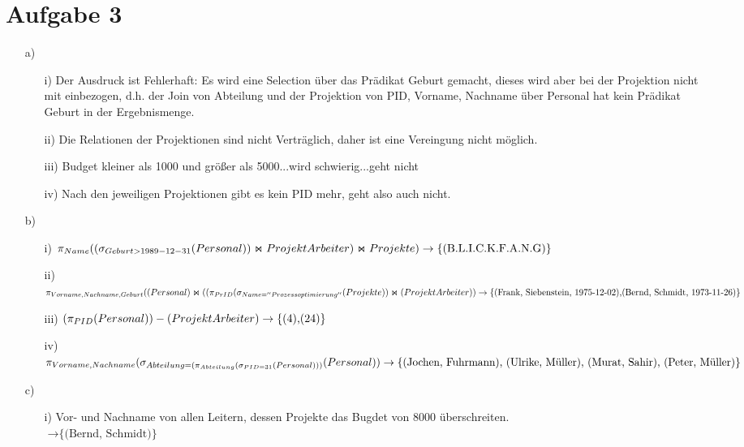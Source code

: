 \documentclass[a4paper,10pt,]{scrartcl}
\begin{document}
\section*{Aufgabe 3}
\begin{enumerate}
 \item[a)]
 \begin{enumerate}
  \item[i)] Der Ausdruck ist Fehlerhaft: Es wird eine Selection über das Prädikat Geburt gemacht, dieses wird aber bei der Projektion nicht mit einbezogen, d.h. der Join von Abteilung und der Projektion von PID, Vorname, Nachname über Personal hat kein Prädikat Geburt in der Ergebnismenge.
  \item[ii)] Die Relationen der Projektionen sind nicht Verträglich, daher ist eine Vereingung nicht möglich.
  \item[iii)] Budget kleiner als 1000 und größer als 5000...wird schwierig...geht nicht
  \item[iv)] Nach den jeweiligen Projektionen gibt es kein PID mehr, geht also auch nicht.
 \end{enumerate}

 \item[b)]
 \begin{enumerate}
  \item[i)] $\pi_{Name} ((\sigma_{Geburt>1989-12-31}(Personal)) \Join ProjektArbeiter ) \Join Projekte )\\\rightarrow \text{\{(B.L.I.C.K.F.A.N.G)\}}$
  \item[ii)] $\pi_{Vorname, Nachname, Geburt}((Personal) \Join ((\pi_{PrID}(\sigma_{Name=''Prozessoptimierung''}(Projekte)) \Join (ProjektArbeiter))\\
  \rightarrow \text{\{(Frank, Siebenstein, 1975-12-02),(Bernd, Schmidt, 1973-11-26)\}}$
  \item[iii)] %
  $(\pi_{PID}(Personal)) - (ProjektArbeiter) \\
  \rightarrow \text{\{(4),(24)\}}$
  \item[iv)] %
  $\pi_{Vorname, Nachname}(\sigma_{Abteilung=(\pi_{Abteilung}(\sigma_{PID=31}(Personal)))}(Personal)) \\
  \rightarrow \text{\{(Jochen, Fuhrmann), (Ulrike, Müller), (Murat, Sahir), (Peter, Müller)\}}$
 \end{enumerate}

 \item[c)]
 \begin{enumerate}
  \item[i)] Vor- und Nachname von allen Leitern, dessen Projekte das Bugdet von 8000 überschreiten.\\
  $\rightarrow \text{\{(Bernd, Schmidt)\}}$
 

\end{enumerate}
\end{enumerate}
\end{document}
